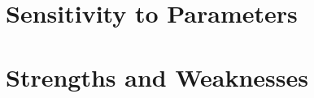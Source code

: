 \documentclass[12pt, letterpaper]{article}  %
\theoremstyle{definition}
\theoremstyle{remark}
\theoremstyle{plain}
\begin{document}












\section{Sensitivity to Parameters}\label{sec:sensitive}






\section{Strengths and Weaknesses}\label{sec:sandw}
\end{document}
